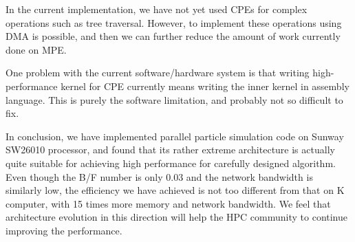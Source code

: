 \documentclass[sigconf]{acmart}
\begin{document}
In the current implementation, we have not yet used CPEs for complex
operations such as  tree traversal. However, to
implement these operations using DMA is possible, and then we can
further reduce the amount of work currently done on MPE.

One  problem with the current software/hardware system is that writing
high-performance kernel for CPE currently means writing the inner
kernel in assembly language. This is purely the software limitation,
and probably not so difficult to fix.

In conclusion, we have implemented parallel particle simulation code
on Sunway SW26010 processor, and found that its rather extreme
architecture is actually quite suitable for achieving high performance
for carefully designed algorithm. Even though the B/F number is only
0.03 and the network bandwidth is similarly low, the efficiency we
have achieved is not too different from that on K computer, with 15
times more memory and network bandwidth. We feel that architecture
evolution in this direction will help the HPC community to continue
improving the performance.




% 




  
\end{document}
